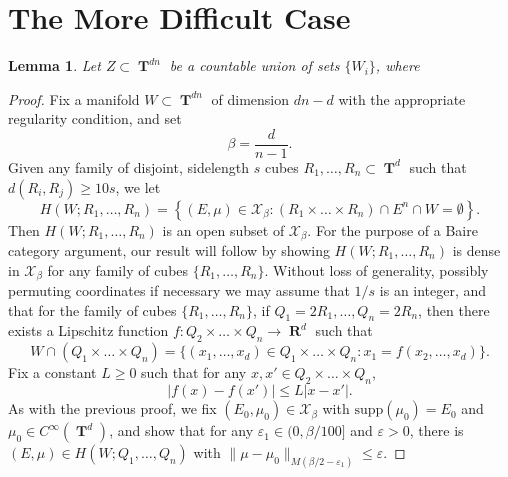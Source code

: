 \documentclass[12pt,reqno]{article}
\numberwithin{equation}{section}
\DeclareMathOperator{\RR}{\mathbf{R}}
\DeclareMathOperator{\TT}{\mathbf{T}}
\newtheorem{lemma}[theorem]{Lemma}
\numberwithin{theorem}{section}
\begin{document}
\section{The More Difficult Case}

\begin{lemma}
    Let $Z \subset \TT^{dn}$ be a countable union of sets $\{ W_i \}$, where
\end{lemma}
\begin{proof}
    Fix a manifold $W \subset \TT^{dn}$ of dimension $dn - d$ with the appropriate regularity condition, and set
    \[ \beta = \frac{d}{n-1}. \]
    Given any family of disjoint, sidelength $s$ cubes $R_1,\dots,R_n \subset \TT^d$ such that $d(R_i,R_j) \geq 10s$, we let
    \begin{equation}
        H(W;R_1,\dots,R_n) = \left\{ (E,\mu) \in \mathcal{X}_\beta: (R_1 \times \dots \times R_n) \cap E^n \cap W = \emptyset \right\}.
    \end{equation}
    Then $H(W;R_1,\dots,R_n)$ is an open subset of $\mathcal{X}_\beta$. For the purpose of a Baire category argument, our result will follow by showing $H(W;R_1,\dots,R_n)$ is dense in $\mathcal{X}_\beta$ for any family of cubes $\{ R_1,\dots, R_n \}$. Without loss of generality, possibly permuting coordinates if necessary we may assume that $1/s$ is an integer, and that for the family of cubes $\{ R_1,\dots, R_n \}$, if $Q_1 = 2R_1,\dots, Q_n = 2R_n$, then there exists a Lipschitz function $f: Q_2 \times \dots \times Q_n \to \RR^d$ such that
    \begin{equation}
        W \cap (Q_1 \times \dots \times Q_n) = \{ (x_1,\dots,x_d) \in Q_1 \times \dots \times Q_n : x_1 = f(x_2,\dots,x_d) \}.
    \end{equation}
    Fix a constant $L \geq 0$ such that for any $x,x' \in Q_2 \times \dots \times Q_n$,
    \begin{equation}
        |f(x) - f(x')| \leq L |x - x'|.
    \end{equation}
    As with the previous proof, we fix $(E_0,\mu_0) \in \mathcal{X}_\beta$ with $\text{supp}(\mu_0) = E_0$ and $\mu_0 \in C^\infty(\TT^d)$, and show that for any $\varepsilon_1 \in (0,\beta/100]$ and $\varepsilon > 0$, there is $(E,\mu) \in H(W;Q_1,\dots,Q_n)$ with $\| \mu - \mu_0 \|_{M(\beta/2-\varepsilon_1)} \leq \varepsilon$.


\end{proof}
\end{document}
